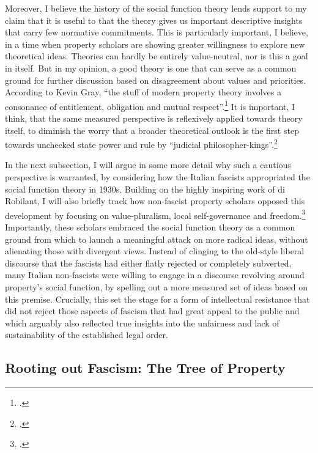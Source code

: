 Moreover, I believe the history of the social function theory lends support to my claim that it is useful to  that the theory gives us important descriptive insights that carry few normative commitments. This is particularly important, I believe, in a time when property scholars are showing greater willingness to explore new theoretical ideas. Theories can hardly be entirely value-neutral, nor is this a goal in itself. But in my opinion, a good theory is one that can serve as a common ground for further discussion based on disagreement about values and priorities. According to Kevin Gray, ``the stuff of modern property theory involves a consonance of entitlement, obligation and mutual respect''.\footcite[37]{gray11} It is important, I think, that the same measured perspective is reflexively applied towards theory itself, to diminish the worry that a broader theoretical outlook is the first step towards unchecked state power and rule by ``judicial philosopher-kings''.\footcite[944]{claeys09}

In the next subsection, I will argue in some more detail why such a cautious perspective is warranted, by considering how the Italian fascists appropriated the social function theory in 1930s. Building on the highly inspiring work of di Robilant, I will also briefly track how non-fascist property scholars opposed this development by focusing on value-pluralism, local self-governance and freedom.\footcite{robilant13} Importantly, these scholars embraced the social function theory as a common ground from which to launch a meaningful attack on more radical ideas, without alienating those with divergent views. Instead of clinging to the old-style liberal discourse that the fascists had either flatly rejected or completely subverted, many Italian non-fascists were willing to engage in a discourse revolving around property's social function, by spelling out a more measured set of ideas based on this premise. Crucially, this set the stage for a form of intellectual resistance that did not reject those aspects of fascism that had great appeal to the public and which arguably also reflected true insights into the unfairness and lack of sustainability of the established legal order.

\subsection{Rooting out Fascism: {T}he Tree of Property}

